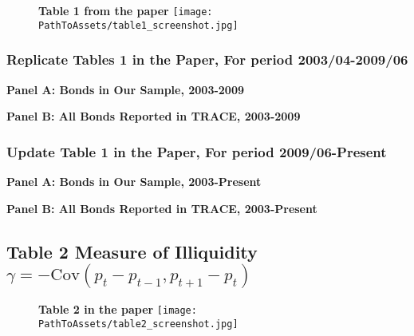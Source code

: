 \documentclass{article}
\newcommand*{\PathToAssets}{../assets}%
\newcommand*{\PathToOutput}{../output/}%
\begin{document}
\begin{figure}[hbt!]
\centering
\textbf{\large Table 1 from the paper}
\texttt{[image: \\PathToAssets/table1\_screenshot.jpg]}
\end{figure}


\subsubsection{Replicate Tables 1 in the Paper, For period 2003/04-2009/06}
\doublespacing


\begin{table}[hbt!]
\centering
\textbf{\large Panel A: Bonds in Our Sample, 2003-2009}
\resizebox{\textwidth}{!}{%
    
}
\label{table:table1_panelA}
\end{table}


\begin{table}[hbt!]
\centering
\textbf{\large Panel B: All Bonds Reported in TRACE, 2003-2009}
\resizebox{\textwidth}{!}{%
    
}
\label{table:table1_panelB}
\end{table}


\subsubsection{Update Table 1 in the Paper, For period 2009/06-Present}
\doublespacing

\begin{table}[hbt!]
\centering
\textbf{\large Panel A: Bonds in Our Sample, 2003-Present}
\resizebox{\textwidth}{!}{%
    
}
\label{table:  table1_panelA_uptodate}
\end{table}


\begin{table}[hbt!]
\centering
\textbf{\large Panel B: All Bonds Reported in TRACE, 2003-Present}
\resizebox{\textwidth}{!}{%
    
}
\label{table:  table1_panelB_uptodate}
\end{table}



\subsection{Table 2 Measure of Illiquidity $ \gamma = -\text{Cov}(p_t - p_{t-1}, p_{t+1} - p_t) $ }


\begin{figure}[hbt!]
\centering
\textbf{\large Table 2 in the paper}
\texttt{[image: \\PathToAssets/table2\_screenshot.jpg]}
\end{figure}
\end{document}
